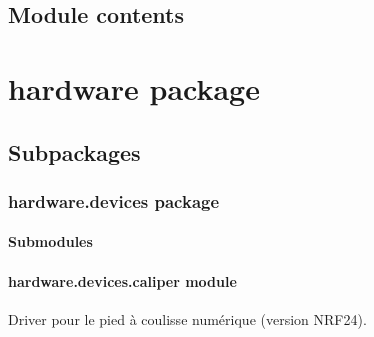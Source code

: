 \documentclass[letterpaper,10pt,french]{sphinxmanual}
\begin{document}
\subsection{Module contents}
\label{\detokenize{api/core:module-core}}\label{\detokenize{api/core:module-contents}}
\sphinxstepscope


\section{hardware package}
\label{\detokenize{api/hardware:hardware-package}}\label{\detokenize{api/hardware::doc}}

\subsection{Subpackages}
\label{\detokenize{api/hardware:subpackages}}
\sphinxstepscope


\subsubsection{hardware.devices package}
\label{\detokenize{api/hardware.devices:hardware-devices-package}}\label{\detokenize{api/hardware.devices::doc}}

\paragraph{Submodules}
\label{\detokenize{api/hardware.devices:submodules}}

\paragraph{hardware.devices.caliper module}
\label{\detokenize{api/hardware.devices:module-hardware.devices.caliper}}\label{\detokenize{api/hardware.devices:hardware-devices-caliper-module}}
\sphinxAtStartPar
Driver pour le pied à coulisse numérique (version NRF24).
\end{document}
